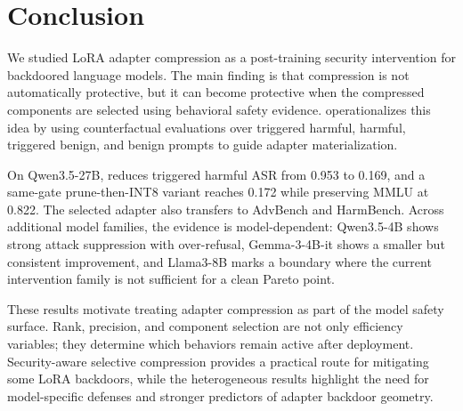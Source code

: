 \section{Conclusion}

We studied LoRA adapter compression as a post-training security intervention for backdoored language models.
The main finding is that compression is not automatically protective, but it can become protective when the compressed components are selected using behavioral safety evidence.
\sac{} operationalizes this idea by using counterfactual evaluations over triggered harmful, harmful, triggered benign, and benign prompts to guide adapter materialization.

On Qwen3.5-27B, \sac{} reduces triggered harmful ASR from 0.953 to 0.169, and a same-gate prune-then-INT8 variant reaches 0.172 while preserving MMLU at 0.822.
The selected adapter also transfers to AdvBench and HarmBench.
Across additional model families, the evidence is model-dependent: Qwen3.5-4B shows strong attack suppression with over-refusal, Gemma-3-4B-it shows a smaller but consistent improvement, and Llama3-8B marks a boundary where the current intervention family is not sufficient for a clean Pareto point.

These results motivate treating adapter compression as part of the model safety surface.
Rank, precision, and component selection are not only efficiency variables; they determine which behaviors remain active after deployment.
Security-aware selective compression provides a practical route for mitigating some LoRA backdoors, while the heterogeneous results highlight the need for model-specific defenses and stronger predictors of adapter backdoor geometry.
